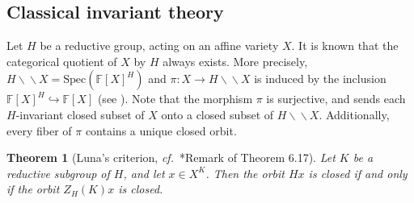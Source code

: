 \documentclass[12pt]{amsart}
\newtheorem{theorem}[lm]{Theorem}
\newtheorem{prop}[lm]{Proposition}
\theoremstyle{definition}
\newtheorem{defn}[lm]{Definition}
\theoremstyle{remark}\newtheorem{rmk}[lm]{Remark}
\newcommand{\Spec}{{\mathrm{Spec}}}
\newcommand{\C}{\mathbb{F}}
\newcommand{\bac}{\backslash\!\!\backslash}
\renewcommand{\mid}{\,:\,}
\newcommand{\cf}{\emph{cf.}~}
\begin{document}
	\subsection{Classical invariant theory}
	Let $H$ be a reductive group, acting on an affine variety $X$.
	It is known that the categorical quotient of $X$ by $H$ always exists. More precisely, $H\bac X=\Spec\left(\C[X]^H\right)$ and $\pi:X\to H\bac X$ is induced by the inclusion $\C[X]^H\hookrightarrow\C[X]$  (see \cite{PV}). Note that the morphism $\pi$ is surjective, and sends each $H$-invariant closed subset of $X$ onto a closed subset of $H\bac X$. Additionally,  every fiber of $\pi$ contains a unique closed orbit.
	
	\begin{theorem}[Luna's criterion, \cf \cite{PV}*{Remark of Theorem 6.17}]
		\label{thm:Lunacriterion}
		Let $K$ be a reductive subgroup of $H$, and let $x\in X^K$. Then the orbit $Hx$ is closed if and only if the orbit $Z_H(K)x$ is closed.
	\end{theorem}
    
\end{document}
